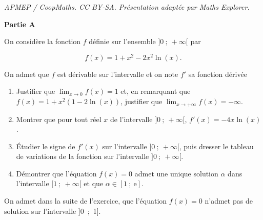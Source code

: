 \documentclass[10pt]{article}
\begin{document}
\noindent\textit{APMEP / CoopMaths. CC BY-SA. Présentation adaptée par Maths Explorer.}\par\medskip
\medskip

\textbf{Partie A}

\medskip

On considère la fonction $f$ définie sur l'ensemble $]0~;~+ \infty[$ par

\[f(x) = 1 + x^2 - 2x^2\ln (x).\]

On admet que $f$ est dérivable sur l'intervalle et on note $f'$ sa fonction dérivée

\medskip

\begin{enumerate}
\item Justifier que $\displaystyle\lim_{x \to 0} f(x) = 1$ et, en remarquant que $f(x) = 1 + x^2(1 - 2\ln (x))$, justifier que $\displaystyle\lim_{x \to + \infty} f(x) = - \infty$.
\item Montrer que pour tout réel $x$  de l'intervalle $]0~;~+ \infty[$, \: $f'(x) = - 4x\ln (x)$.
\item Étudier le signe de $f'(x)$ sur l'intervalle $]0~;~+ \infty[$, puis dresser le tableau de variations de la fonction sur l'intervalle $]0~;~+ \infty[$.
\item Démontrer que l'équation $f(x) = 0$ admet une unique solution $\alpha$ dans l'intervalle $[1~;~+ \infty[$ et que $\alpha \in [1~;~\text{e}]$.
\end{enumerate}

On admet dans la suite de l'exercice, que l'équation $f(x) = 0$ n'admet pas de solution sur l'intervalle ]0~;~1].
\end{document}
